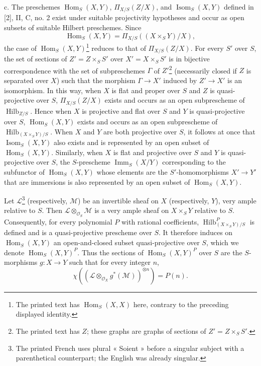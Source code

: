 \medskip
\noindent c. The preschemes $\operatorname{Hom}_S(X,Y)$,
$\Pi_{X/S}(Z/X)$, and $\operatorname{Isom}_S(X,Y)$ defined in [2], II, C,
no. 2 exist under suitable projectivity hypotheses and occur as open subsets
of suitable Hilbert preschemes. Since
\[
\operatorname{Hom}_S(X,Y)=\Pi_{X/S}((X\times_SY)/X),
\]
the case of $\operatorname{Hom}_S(X,Y)$\footnote{The printed text has $\operatorname{Hom}_S(X,X)$ here, contrary to the preceding displayed identity.} reduces to that of
$\Pi_{X/S}(Z/X)$. For every $S'$ over $S$, the set of sections of
$Z'=Z\times_SS'$ over $X'=X\times_SS'$ is in bijective correspondence with
the set of subpreschemes $\Gamma$ of $Z'$\footnote{The printed text has $Z$; these graphs are graphs of sections of $Z'=Z\times_SS'$.} (necessarily closed if $Z$ is
separated over $X$) such that the morphism $\Gamma\longrightarrow X'$ induced
by $Z'\longrightarrow X'$ is an isomorphism. In this way,
when $X$ is flat and proper over $S$ and $Z$ is quasi-projective over $S$,
$\Pi_{X/S}(Z/X)$ exists and occurs as an open subprescheme of
$\operatorname{Hilb}_{Z/S}$. Hence when $X$ is projective and flat over $S$
and $Y$ is quasi-projective over $S$, $\operatorname{Hom}_S(X,Y)$ exists and
occurs as an open subprescheme of
$\operatorname{Hilb}_{(X\times_SY)/S}$. When $X$ and $Y$ are both projective
over $S$, it follows at once that $\operatorname{Isom}_S(X,Y)$ also exists and
is represented by an open subset of $\operatorname{Hom}_S(X,Y)$. Similarly,
when $X$ is flat and projective over $S$ and $Y$ is quasi-projective over $S$,
the $S$-prescheme $\operatorname{Imm}_S(X/Y)$ corresponding to the subfunctor
of $\operatorname{Hom}_S(X,Y)$ whose elements are the $S'$-homomorphisms
$X'\longrightarrow Y'$ that are immersions is also represented by an open
subset of $\operatorname{Hom}_S(X,Y)$.

Let $\mathcal L$\footnote{The printed French uses plural « Soient » before a singular subject with a parenthetical counterpart; the English was already singular.} (respectively, $\mathcal M$) be an invertible sheaf on $X$
(respectively, $Y$), very ample relative to $S$. Then
$\mathcal L\otimes_{\mathcal O_S}\mathcal M$ is a very ample sheaf on
$X\times_SY$ relative to $S$. Consequently, for every polynomial $P$ with
rational coefficients, $\operatorname{Hilb}^P_{(X\times_SY)/S}$ is defined
and is a quasi-projective prescheme over $S$. It therefore induces on
$\operatorname{Hom}_S(X,Y)$ an open-and-closed subset quasi-projective over
$S$, which we denote $\operatorname{Hom}_S(X,Y)^P$. Thus the sections of
$\operatorname{Hom}_S(X,Y)^P$ over $S$ are the $S$-morphisms
$g:X\longrightarrow Y$ such that for every integer $n$,
\[
\chi\!\left(\left(\mathcal L\otimes_{\mathcal O_X}g^*(\mathcal M)\right)^{
\otimes n}\right)=P(n).
\]

